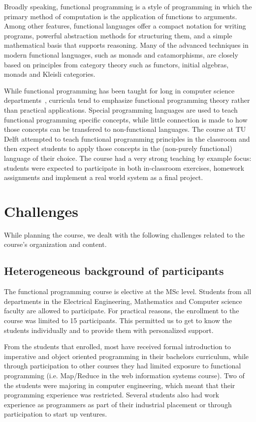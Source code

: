 \documentclass[conference]{IEEEtran}
\begin{document}
Broadly speaking, functional programming is a style of programming in which the
primary method of computation is the application of functions to arguments.
Among other features, functional languages offer a compact notation for writing
programs, powerful abstraction methods for structuring them, and a simple
mathematical basis that supports reasoning. Many of the advanced techniques in
modern functional languages, such as monads and catamorphisms, are closely based
on principles from category theory such as functors, initial algebras, monads
and Kleisli categories.

While functional programming has been taught for long in computer science
departments~\cite{Joost93}, curricula tend to emphasize functional programming
theory rather than practical applications. Special programming languages are
used to teach functional programming specific concepts, while little connection
is made to how those concepts can be transfered to non-functional languages.
The course at TU Delft attempted to teach functional programming principles in the
classroom and then expect students to apply those concepts in the (non-purely
functional) language of their choice. The course had a very strong teaching by
example focus: students were expected to participate in both in-classroom
exercises, homework assignments and implement a real world system as a final
project.

\section{Challenges}

While planning the course, we dealt with the following challenges related
to the course's organization and content.

\subsection{Heterogeneous background of participants}

The functional programming course is elective at the MSc level. Students
from all departments in the Electrical Engineering, Mathematics and Computer
science faculty are allowed to participate. For practical reasons, the
enrollment to the course was limited to 15 participants. This permitted
us to get to know the students individually and to provide them with
personalized support.

From the students that enrolled, most have received formal introduction to
imperative and object oriented programming in their bachelors curriculum, while
through participation to other courses they had limited exposure to functional
programming (i.e. Map/Reduce in the web information systems
course). Two of the students were majoring in computer engineering, which meant
that their programming experience was restricted. Several students also had work
experience as programmers as part of their industrial placement or through
participation to start up ventures.
\end{document}
